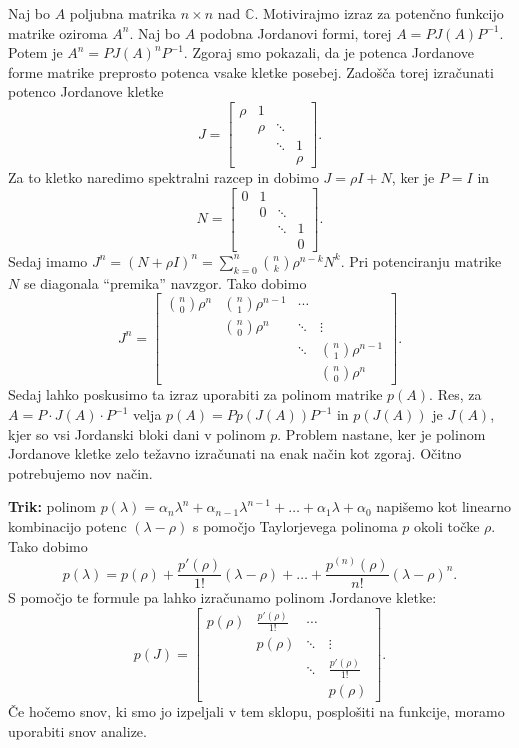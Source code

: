 \documentclass[10pt, a4paper]{article}
\newcommand{\C}{\mathbb {C}}
\begin{document}
Naj bo $A$ poljubna matrika $n \times n$ nad $\C$.
Motivirajmo izraz za potenčno funkcijo matrike oziroma $A^n$.
Naj bo $A$ podobna Jordanovi formi, torej $A = P J(A) P^{-1}.$
Potem je $A^n = P J(A)^n P^{-1}$.
Zgoraj smo pokazali, da je potenca Jordanove forme matrike preprosto potenca vsake kletke posebej.
Zadošča torej izračunati potenco Jordanove kletke 
$$J = \begin{bmatrix}
    \rho & 1 & & \\
    & \rho & \ddots & \\
    & & \ddots & 1 \\
    & & & \rho
\end{bmatrix}.$$
Za to kletko naredimo spektralni razcep in dobimo $J = \rho I + N$, ker je $P = I$ in 
$$N = \begin{bmatrix}
    0 & 1 & & \\
    & 0 & \ddots & \\
    & & \ddots & 1 \\
    & & & 0
\end{bmatrix}.$$
Sedaj imamo $J^n = (N + \rho I)^n = \sum_{k = 0} ^n \binom{n}{k} \rho^{n-k} N^k$.
Pri potenciranju matrike $N$ se diagonala "`premika"' navzgor.
Tako dobimo 
$$J^n = \begin{bmatrix}
    \binom{n}{0}\rho^n & \binom{n}{1} \rho^{n-1} & \cdots & \\
    & \binom{n}{0}\rho^n & \ddots & \vdots\\
    & & \ddots & \binom{n}{1} \rho^{n-1} \\
    & & & \binom{n}{0}\rho^n
\end{bmatrix}.$$
Sedaj lahko poskusimo ta izraz uporabiti za polinom matrike $p(A)$.
Res, za $A = P \cdot J(A) \cdot P^{-1}$ velja $p(A) = P p(J(A)) P^{-1}$
in $p(J(A))$ je $J(A)$, kjer so vsi Jordanski bloki dani v polinom $p$.
Problem nastane, ker je polinom Jordanove kletke zelo težavno izračunati na enak način kot zgoraj.
Očitno potrebujemo nov način.

\textbf{Trik:} polinom $p(\lambda) = \alpha_n \lambda^n + \alpha_{n-1} \lambda^{n-1} + \dots + \alpha_1 \lambda + \alpha_0$ 
napišemo kot linearno kombinacijo potenc $(\lambda - \rho)$ s pomočjo Taylorjevega polinoma $p$ okoli točke $\rho$.
Tako dobimo $$p(\lambda) = p(\rho) + \frac{p'(\rho)}{1!} (\lambda - \rho) + \dots + \frac{p^{(n)}(\rho)}{n!} (\lambda - \rho)^n.$$
S pomočjo te formule pa lahko izračunamo polinom Jordanove kletke:
$$p(J) = \begin{bmatrix}
    p(\rho) & \frac{p'(\rho)}{1!} & \cdots & \\
    & p(\rho) & \ddots & \vdots\\
    & & \ddots & \frac{p'(\rho)}{1!} \\
    & & & p(\rho)
\end{bmatrix}.$$
Če hočemo snov, ki smo jo izpeljali v tem sklopu, posplošiti na funkcije,
moramo uporabiti snov analize.
\end{document}
